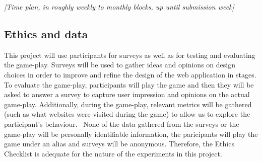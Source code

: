 \documentclass[11pt]{article}
\begin{document}
\emph{{[}Time plan, in roughly weekly to monthly blocks, up until
submission week{]}}

    
\subsection{Ethics and data}\label{ethics}
This project will use participants for surveys as well as for testing and evaluating the game-play. Surveys will be used to gather ideas and opinions on design choices in order to improve and refine the design of the web application in stages. To evaluate the game-play, participants will play the game and then they will be asked to answer a survey to capture user impression and opinions on the actual game-play. Additionally, during the game-play, relevant metrics will be gathered (such as what websites were visited during the game) to allow us to explore the participant's behaviour. \
None of the data gathered from the surveys or the game-play will be personally identifiable information, the paricipants will play the game under an alias and surveys will be anonymous. Therefore, the Ethics Checklist is adequate for the nature of the experiments in this project.
\end{document}
